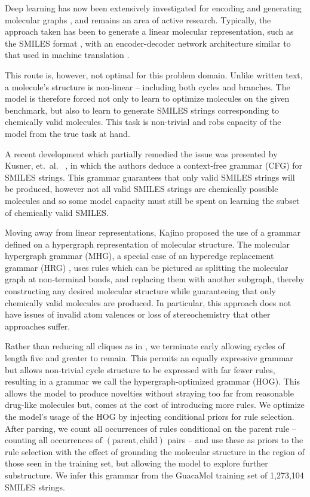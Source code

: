 \documentclass{article}
\begin{document}
Deep learning has now been extensively investigated for encoding and generating molecular graphs \cite{duvenaud2015, kearnes2016, gilmer2017, dai2018, jin2018, simonovsky2018, kusner2017, gomezbombarelli2016, guimaraes2017, pogany2019}, and remains an area of active research. Typically, the approach taken has been to generate a linear molecular representation, such as the SMILES format \cite{weininger1988}, with an encoder-decoder network architecture similar to that used in machine translation \cite{gomezbombarelli2016}.

This route is, however, not optimal for this problem domain. Unlike written text, a molecule's structure is non-linear -- including both cycles and branches. The model is therefore forced not only to learn to optimize molecules on the given benchmark, but also to learn to generate SMILES strings corresponding to chemically valid molecules. This task is non-trivial and robs capacity of the model from the true task at hand.

A recent development which partially remedied the issue was presented by Kusner, et.~al.~ \cite{kusner2017}, in which the authors deduce a context-free grammar (CFG) for SMILES strings. This grammar guarantees that only valid SMILES strings will be produced, however not all valid SMILES strings are chemically possible molecules and so some model capacity must still be spent on learning the subset of chemically valid SMILES.

Moving away from linear representations, Kajino \cite{kajino2018} proposed the use of a grammar defined on a hypergraph representation of molecular structure. The molecular hypergraph grammar (MHG), a special case of an hyperedge replacement grammar (HRG) \cite{drewes1997}, uses rules which can be pictured as splitting the molecular graph at non-terminal bonds, and replacing them with another subgraph, thereby constructing any desired molecular structure while guaranteeing that only chemically valid molecules are produced. In particular, this approach does not have issues of invalid atom valences or loss of stereochemistry that other approaches suffer.

Rather than reducing all cliques as in \cite{kajino2018}, we terminate early allowing cycles of length five and greater to remain. This permits an equally expressive grammar but allows non-trivial cycle structure to be expressed with far fewer rules, resulting in a grammar we call the hypergraph-optimized grammar (HOG). This allows the model to produce novelties without straying too far from reasonable drug-like molecules but, comes at the cost of introducing more rules. We optimize the model's usage of the HOG by injecting conditional priors for rule selection. After parsing, we count all occurrences of rules conditional on the parent rule -- counting all occurrences of $(\text{parent}, \text{child})$ pairs -- and use these as priors to the rule selection with the effect of grounding the molecular structure in the region of those seen in the training set, but allowing the model to explore further substructure. We infer this grammar from the GuacaMol \cite{brown2019} training set of 1,273,104 SMILES strings.
\end{document}
